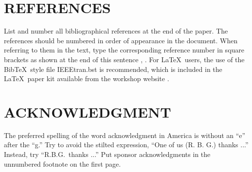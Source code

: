 \documentclass{article}
\begin{document}
\begin{sloppy}
\section{REFERENCES}
\label{sec:ref}

List and number all bibliographical references at the end 
of the paper. The references should be numbered in order 
of appearance in the document. When referring to them in 
the text, type the corresponding reference number in 
square brackets as shown at the end of this sentence 
\cite{cJones2003}, \cite{aSmith2000}. For \LaTeX\ users, 
the use of the Bib\TeX\ style file IEEEtran.bst is 
recommended, which is included in the \LaTeX\ paper 
kit available from the workshop website \cite{aaspweb}.

\section{ACKNOWLEDGMENT}
\label{sec:ack}

The preferred spelling of the word acknowledgment in 
America is without an ``e'' after the ``g.'' Try to avoid 
the stilted expression, ``One of us (R. B. G.) thanks ...''
Instead, try ``R.B.G.\ thanks ...''  Put sponsor 
acknowledgments in the unnumbered footnote on the first page.



%
% 
%
%
%
% 
%
% 
% 


\end{sloppy}
\end{document}
